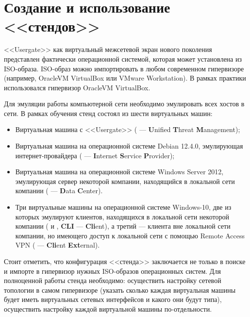 \section{Создание и использование <<стендов>>}
	\begin{justify}
		\newPar{}<<Usergate>> как виртуальный межсетевой экран нового поколения представлен фактически операционной системой, которая может установлена из ISO-образа. ISO-образ можно импортировать в любом современном гипервизоре (например, OracleVM VirtualBox или VMware Workstation). В рамках практики использовался гипервизор OracleVM VirtualBox.
		
		Для эмуляции работы компьютерной сети необходимо эмулировать всех хостов в сети. В рамках обучения стенд состоял из шести виртуальных машин:
		
		\begin{itemize}
			\item Виртуальная машина с <<Usergate>> (\UTM{} --- \textbf{U}nified \textbf{T}hreat \textbf{M}anagement);
			
			\item Виртуальная машина на операционной системе Debian 12.4.0, эмулирующая интернет-провайдера (\ISP{} --- \textbf{I}nternet \textbf{S}ervice \textbf{P}rovider);
			
			\item Виртуальная машина на операционной системе Windows Server 2012, эмулирующая сервер некоторой компании, находящийся в локальной сети компании (\DC{} --- \textbf{D}ata \textbf{C}enter).
			
			\item Три виртуальные машины на операционной системе Windows-10, две из которых эмулируют клиентов, находящихся в локальной сети некоторой компании (\CLIA{} и \CLIB{}, \textbf{CLI} --- \textbf{Cli}ent), а третий --- клиента вне локальной сети компании, но имеющего доступ к локальной сети с помощью Remote Access VPN (\CLIEXT{} --- \textbf{Cli}ent \textbf{Ext}ernal).
		\end{itemize}
		
		Стоит отметить, что конфигурация <<стенда>> заключается не только в поиске и импорте в гипервизор нужных ISO-образов операционных систем. Для полноценной работы стенда необходимо: осуществить настройку сетевой топологии в самом гипервизоре (указать сколько каждая виртуальная машины будет иметь виртуальных сетевых интерфейсов и какого они будут типа), осуществить настройку каждой виртуальной машины по-отдельности. 
		

\end{justify}
